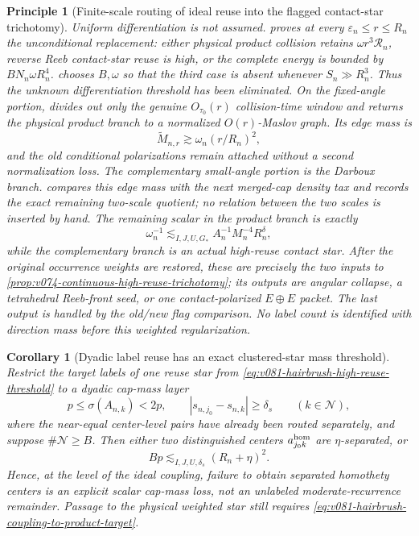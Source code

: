 \documentclass[10pt]{article}
\newtheorem{corollary}[theorem]{Corollary}
\newtheorem{principle}[theorem]{Principle}
\begin{document}
\begin{principle}[Finite-scale routing of ideal reuse into the flagged contact-star trichotomy]
Uniform differentiation is not assumed.   proves at every
\(\varepsilon_n\le r\le R_n\) the unconditional replacement: either physical product collision
retains \(\omega r^3\mathcal R_n\), reverse Reeb contact-star reuse is high, or the complete energy
is bounded by \(BN_n\omega R_n^4\).   chooses \(B,\omega\) so that the third case is
absent whenever \(S_n\gg R_n^3\).  Thus the unknown differentiation threshold has been eliminated.
On the fixed-angle portion,  divides out only the genuine
\(O_{\tau_0}(r)\) collision-time window and returns the physical product branch to a normalized
\(O(r)\)-Maslov graph.  Its edge mass is
\[
\widetilde M_{n,r}
\gtrsim
\omega_n(r/R_n)^2,
\]
and the old conditional polarizations remain attached without a second normalization loss.
The complementary small-angle portion is the Darboux branch.
 compares this edge mass with the
next merged-cap density tax and records the exact remaining two-scale quotient; no relation between
the two scales is inserted by hand.
The remaining scalar in the product branch is exactly
\[
\omega_n^{-1}
\lesssim_{I,J,U,G_*}
A_n^{-1}M_n^{-4}R_n^\delta,
\]
while the complementary branch is an actual high-reuse contact star.  After the original
occurrence weights are restored, these are precisely the two inputs to
\cref{prop:v074-continuous-high-reuse-trichotomy}; its outputs are angular collapse, a tetrahedral
Reeb-front seed, or one contact-polarized \(E\oplus E\) packet.  The last output is handled by the
old/new flag comparison.  No label count is identified with direction mass before this weighted
regularization.
\end{principle}

\begin{corollary}[Dyadic label reuse has an exact clustered-star mass threshold]
\label{cor:v081-hairbrush-dyadic-star-threshold}
Restrict the target labels of one reuse star from
\eqref{eq:v081-hairbrush-high-reuse-threshold} to a dyadic cap-mass layer
\[
p\le\sigma(A_{n,k})<2p,
\qquad
|s_{n,j_0}-s_{n,k}|\ge\delta_s
\qquad(k\in\mathcal N),
\]
where the near-equal center-level pairs have already been routed separately, and suppose
\(\#\mathcal N\ge B\).  Then either two distinguished centers
\(a_{j_0k}^{\rm hom}\) are \(\eta\)-separated, or
\begin{equation}
\label{eq:v081-hairbrush-clustered-reuse-threshold}
\boxed{
Bp
\lesssim_{I,J,U,\delta_s}
(R_n+\eta)^2.
}
\end{equation}
Hence, at the level of the ideal coupling, failure to obtain separated homothety centers is an
explicit scalar cap-mass loss, not an unlabeled moderate-recurrence remainder.  Passage to the
physical weighted star still requires
\eqref{eq:v081-hairbrush-coupling-to-product-target}.
\end{corollary}
\end{document}

